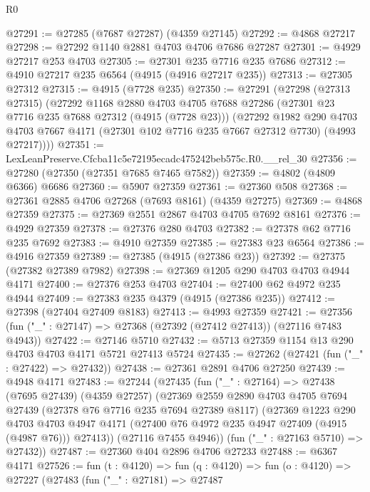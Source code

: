 \begin{lexlean}{R0}
\begin{coremodule}
@27291 := @27285 (@7687 @27287) (@4359 @27145)
@27292 := @4868 @27217
@27298 := @27292 @1140 @2881 @4703 @4706 @7686 @27287
@27301 := @4929 @27217 @253 @4703
@27305 := @27301 @235 @7716 @235 @7686
@27312 := @4910 @27217 @235 @6564 (@4915 (@4916 @27217 @235))
@27313 := @27305 @27312
@27315 := @4915 (@7728 @235)
@27350 := @27291
    (@27298
      (@27313 @27315)
      (@27292
        @1168
        @2880
        @4703
        @4705
        @7688
        @27286
        (@27301 @23 @7716 @235 @7688 @27312 (@4915 (@7728 @23)))
        (@27292
          @1982
          @290
          @4703
          @4703
          @7667
          @4171
          (@27301 @102 @7716 @235 @7667 @27312 @7730)
          (@4993 @27217))))
@27351 := LexLeanPreserve.Cfcba11c5e72195ecadc475242beb575c.R0.__rel_30
@27356 := @27280 (@27350 (@27351 @7685 @7465 @7582))
@27359 := @4802 (@4809 @6366) @6686
@27360 := @5907 @27359
@27361 := @27360 @508
@27368 := @27361 @2885 @4706 @27268 (@7693 @8161) (@4359 @27275)
@27369 := @4868 @27359
@27375 := @27369 @2551 @2867 @4703 @4705 @7692 @8161
@27376 := @4929 @27359
@27378 := @27376 @280 @4703
@27382 := @27378 @62 @7716 @235 @7692
@27383 := @4910 @27359
@27385 := @27383 @23 @6564
@27386 := @4916 @27359
@27389 := @27385 (@4915 (@27386 @23))
@27392 := @27375 (@27382 @27389 @7982)
@27398 := @27369 @1205 @290 @4703 @4703 @4944 @4171
@27400 := @27376 @253 @4703
@27404 := @27400 @62 @4972 @235 @4944
@27409 := @27383 @235 @4379 (@4915 (@27386 @235))
@27412 := @27398 (@27404 @27409 @8183)
@27413 := @4993 @27359
@27421 := @27356 (fun ("_" : @27147) => @27368 (@27392 (@27412 @27413)) (@27116 @7483 @4943))
@27422 := @27146 @5710
@27432 := @5713 @27359 @1154 @13 @290 @4703 @4703 @4171 @5721 @27413 @5724
@27435 := @27262 (@27421 (fun ("_" : @27422) => @27432))
@27438 := @27361 @2891 @4706 @27250
@27439 := @4948 @4171
@27483 := @27244
    (@27435
      (fun ("_" : @27164) =>
      @27438
        (@7695 @27439)
        (@4359 @27257)
        (@27369
          @2559
          @2890
          @4703
          @4705
          @7694
          @27439
          (@27378 @76 @7716 @235 @7694 @27389 @8117)
          (@27369
            @1223
            @290
            @4703
            @4703
            @4947
            @4171
            (@27400 @76 @4972 @235 @4947 @27409 (@4915 (@4987 @76)))
            @27413))
        (@27116 @7455 @4946))
      (fun ("_" : @27163 @5710) => @27432))
@27487 := @27360 @404 @2896 @4706 @27233
@27488 := @6367 @4171
@27526 := fun (t : @4120) =>
  fun (q : @4120) =>
  fun (o : @4120) =>
  @27227
    (@27483
      (fun ("_" : @27181) =>
      @27487

\end{coremodule}
\end{lexlean}
